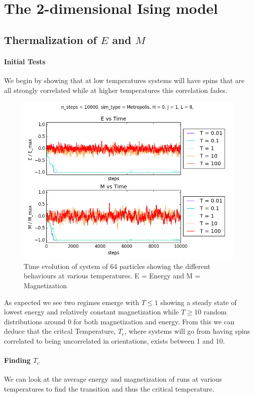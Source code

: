 \documentclass[a4paper,11pt]{article}
\begin{document}
\section{The 2-dimensional Ising model}

    \subsection{Thermalization of $E$ and $M$}

        \paragraph{Initial Tests}We begin by showing that at low temperatures systems will have spins that are all strongly correlated while at higher temperatures this correlation fades.

        \begin{figure}[H]
            \centering
            \includegraphics[width=.75\textwidth]{Graphs/Large_Temp_slice.png}
            \caption{Time evolution of system of 64 particles showing the different behaviours at various temperatures. E = Energy and M = Magnetization} 
        \end{figure}

        As expected we see two regimes emerge with $T \le 1$ showing a steady state of lowest energy and relatively constant magnetization while $T \ge 10$ random distributions around 0 for both magnetization and energy. From this we can deduce that the critcal Temperature, $T_c$, where systems will go from having spins correlated to being uncorrelated in orientations, exists between 1 and 10. 


        \paragraph{Finding $T_c$} We can look at the average energy and magnetization of runs at various temperatures to find the transition and thus the critical temperature.
        
\end{document}
